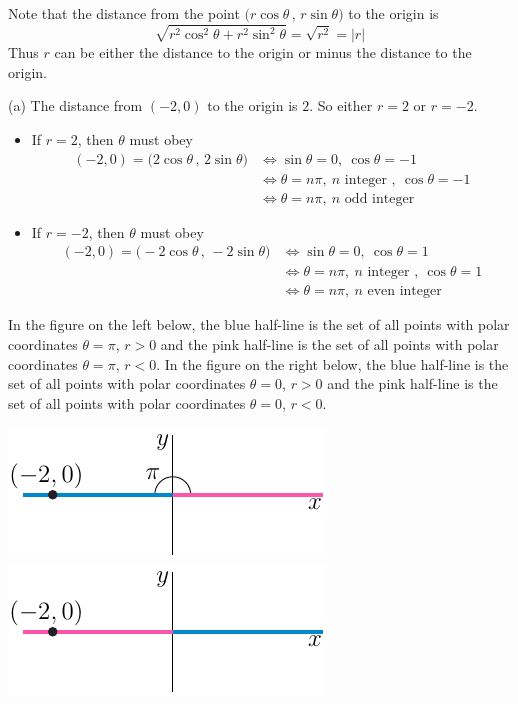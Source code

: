 \begin{solution}
Note that the distance from the point $\big(r\cos\theta\,,\,r\sin\theta\big)$
to the origin is
\begin{equation*}
\sqrt{r^2\cos^2\theta + r^2\sin^2\theta}
=\sqrt{r^2}
=|r|
\end{equation*}
Thus $r$ can be either the distance to the origin or minus the distance to the
origin.

(a) 
The distance from $(-2,0)$ to the origin is $2$. So either $r=2$ or $r=-2$.
\begin{itemize}
\item If $r=2$, then $\theta$ must obey 
\begin{align*}
(-2,0) = \big(2\cos\theta\,,\,2\sin\theta\big)
&\iff \sin\theta=0,\ \cos\theta=-1 \\
&\iff \theta= n\pi,\ n\text{ integer },\ \cos\theta=-1 \\
&\iff \theta= n\pi,\ n\text{ odd integer }
\end{align*}
\item If $r=-2$, then $\theta$ must obey 
\begin{align*}
(-2,0) = \big(-2\cos\theta\,,\,-2\sin\theta\big)
&\iff \sin\theta=0,\ \cos\theta=1 \\
&\iff \theta= n\pi,\ n\text{ integer },\ \cos\theta=1 \\
&\iff \theta= n\pi,\ n\text{ even integer }
\end{align*}
\end{itemize}
In the figure on the left below, the blue half-line is the set of all points 
with polar coordinates $\theta=\pi$, $r>0$ and the pink half-line is the set 
of all points  with polar coordinates $\theta=\pi$, $r<0$. 
In the figure on the right below, the blue half-line is the set of all points 
with polar coordinates $\theta=0$, $r>0$ and the pink half-line is the set 
of all points  with polar coordinates $\theta=0$, $r<0$. 
\begin{center}
  \includegraphics{fig/polar6B.pdf}\qquad
  \includegraphics{fig/polar6A.pdf}
\end{center}



\end{solution}
